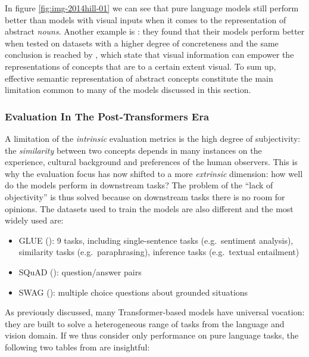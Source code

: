 \documentclass[
]{krantz}
\providecommand{\tightlist}{%
  \setlength{\itemsep}{0pt}\setlength{\parskip}{0pt}}
\begin{document}
In figure \ref{fig:img-2014hill-01} we can see that pure language models still perform better than models with visual inputs when it comes to the representation of abstract \emph{nouns}. Another example is \citet{kiela2017learning}: they found that their models perform better when tested on datasets with a higher degree of concreteness and the same conclusion is reached by \citet{collell2017imagined}, which state that visual information can empower the representations of concepts that are to a certain extent visual. To sum up, effective semantic representation of abstract concepts constitute the main limitation common to many of the models discussed in this section.

\hypertarget{evaluation-in-the-post-transformers-era}{%
\subsubsection{Evaluation In The Post-Transformers Era}\label{evaluation-in-the-post-transformers-era}}

A limitation of the \emph{intrinsic} evaluation metrics is the high degree of subjectivity: the \emph{similarity} between two concepts depends in many instances on the experience, cultural background and preferences of the human observers. This is why the evaluation focus has now shifted to a more \emph{extrinsic} dimension: how well do the models perform in downstream tasks? The problem of the ``lack of objectivity'' is thus solved because on downstream tasks there is no room for opinions. The datasets used to train the models are also different and the most widely used are:

\begin{itemize}
\tightlist
\item
  GLUE (\citet{wang2018glue}): 9 tasks, including single-sentence tasks (e.g.~sentiment analysis), similarity tasks (e.g.~paraphrasing), inference tasks (e.g.~textual entailment)
\item
  SQuAD (\citet{rajpurkar2016squad}): question/answer pairs
\item
  SWAG (\citet{zellers2018swag}): multiple choice questions about grounded situations
\end{itemize}

As previously discussed, many Transformer-based models have universal vocation: they are built to solve a heterogeneous range of tasks from the language and vision domain. If we thus consider only performance on pure language tasks, the following two tables from \citet{tan2020vokenization} are insightful:
\end{document}
